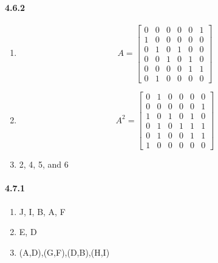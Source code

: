 \documentclass[11pt, letterpaper, twocolumn, fleqn]{article}
\begin{document}
    \paragraph{4.6.2}
        \begin{enumerate}
            \item 
                $$A =   \begin{bmatrix}
                        0 & 0 & 0 & 0 & 0 & 1\\
                        1 & 0 & 0 & 0 & 0 & 0\\
                        0 & 1 & 0 & 1 & 0 & 0\\
                        0 & 0 & 1 & 0 & 1 & 0\\
                        0 & 0 & 0 & 0 & 1 & 1\\
                        0 & 1 & 0 & 0 & 0 & 0
                        \end{bmatrix}$$
            \item
                $$A^2 = \begin{bmatrix}
                        0 & 1 & 0 & 0 & 0 & 0\\
                        0 & 0 & 0 & 0 & 0 & 1\\
                        1 & 0 & 1 & 0 & 1 & 0\\
                        0 & 1 & 0 & 1 & 1 & 1\\
                        0 & 1 & 0 & 0 & 1 & 1\\
                        1 & 0 & 0 & 0 & 0 & 0
                        \end{bmatrix}$$
            \item 2, 4, 5, and 6
        \end{enumerate}
    
    \paragraph{4.7.1}
        \begin{enumerate}
            \item J, I, B, A, F
            \item E, D
            \item (A,D),(G,F),(D,B),(H,I)
        \end{enumerate}
    
\end{document}
